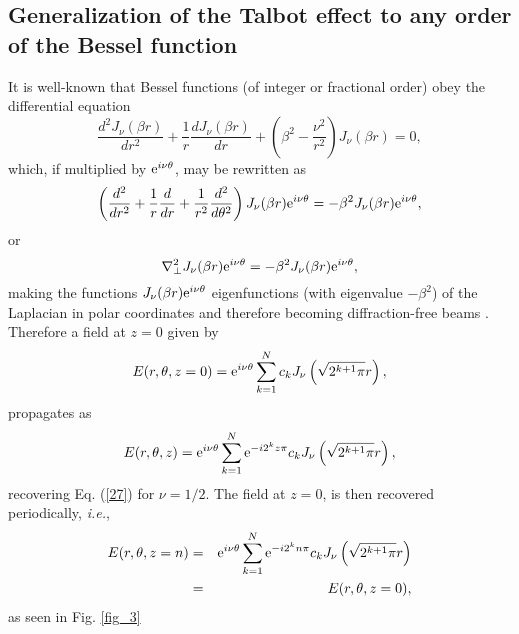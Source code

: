 \documentclass[aps,pra,reprint,superscriptaddress]{revtex4-2}
\begin{document}
\subsection{Generalization of the Talbot effect to any order of the Bessel function} It  is well-known that Bessel functions (of integer or fractional order) obey the differential equation \cite{Gradshtey}
%
%
\begin{equation}
    \frac{d^2J_{\nu}(\beta r)}{dr^2}+\frac{1}{r}\frac{dJ_{\nu}(\beta r)}{dr}+\left(\beta^2-\frac{\nu^2}{r^2}\right)J_{\nu}(\beta r)=0,
\end{equation}
%
%
which, if multiplied by $\hbox{e}^{i\nu\theta}$, may be rewritten as
%
%
\begin{equation}
   \left( \frac{d^2}{dr^2}+\frac{1}{r}\frac{d}{dr}+\frac{1}{r^2}\frac{d^2}{d\theta^2}\right)J_{\nu}(\beta r)\hbox{e}^{i\nu\theta}=-\beta^2J_{\nu}(\beta r)\hbox{e}^{i\nu\theta},
\end{equation}
%
%
or
%
%
\begin{equation}
   \nabla_{\perp}^2J_{\nu}(\beta r)\hbox{e}^{i\nu\theta}=-\beta^2J_{\nu}(\beta r)\hbox{e}^{i\nu\theta},
\end{equation}
%
%
making the functions $J_{\nu}(\beta r)\hbox{e}^{i\nu\theta}$ eigenfunctions (with eigenvalue $-\beta^2$) of the Laplacian in polar coordinates and therefore becoming diffraction-free beams \cite{Durnin1987}. Therefore a field at $z=0$ given by
%
%
\begin{equation}\label{superpo}
   E(r,\theta,z=0)=\hbox{e}^{i\nu\theta}\sum_{k=1}^N c_kJ_{\nu}\left(\sqrt{2^{k+1}\pi}r\right),
\end{equation}
%
%
propagates as
%
%
\begin{equation}
   E(r,\theta,z)=\hbox{e}^{i\nu\theta}\sum_{k=1}^N\hbox{e}^{-i2^{k}z\pi} c_kJ_{\nu}\left(\sqrt{2^{k+1}\pi}r\right),
\end{equation}
%
%
recovering Eq. (\ref{27})  for $\nu=1/2$. The field  at $z=0$, is then recovered periodically, {\it i.e.},
%
%
\begin{eqnarray}\nonumber
   E(r,\theta,z=n)&=&\hbox{e}^{i\nu\theta}\sum_{k=1}^N\hbox{e}^{-i2^{k}n\pi} c_k J_{\nu}\left(\sqrt{2^{k+1}\pi}r\right)\\ &=& E(r,\theta,z=0),
\end{eqnarray}
as seen in Fig. \ref{fig_3}
\end{document}
